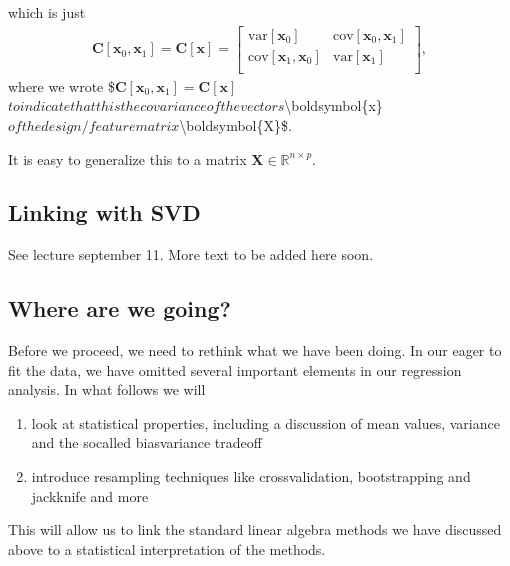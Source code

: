\documentclass[letterpaper,10pt,english]{sphinxmanual}
\begin{document}
which is just
\begin{equation*}
\begin{split}
\boldsymbol{C}[\boldsymbol{x}_0,\boldsymbol{x}_1] = \boldsymbol{C}[\boldsymbol{x}]=\begin{bmatrix} \mathrm{var}[\boldsymbol{x}_0] & \mathrm{cov}[\boldsymbol{x}_0,\boldsymbol{x}_1] \\
                              \mathrm{cov}[\boldsymbol{x}_1,\boldsymbol{x}_0] & \mathrm{var}[\boldsymbol{x}_1] \\
             \end{bmatrix},
\end{split}
\end{equation*}
where we wrote \$\(\boldsymbol{C}[\boldsymbol{x}_0,\boldsymbol{x}_1] = \boldsymbol{C}[\boldsymbol{x}]\)\( to indicate that this the covariance of the vectors \)\textbackslash{}boldsymbol\{x\}\( of the design/feature matrix \)\textbackslash{}boldsymbol\{X\}\$.

It is easy to generalize this to a matrix \(\boldsymbol{X}\in {\mathbb{R}}^{n\times p}\).


\subsection{Linking with SVD}
\label{\detokenize{chapter4:linking-with-svd}}
See lecture september 11. More text to be added here soon.


\subsection{Where are we going?}
\label{\detokenize{chapter4:where-are-we-going}}
Before we proceed, we need to rethink what we have been doing. In our
eager to fit the data, we have omitted several important elements in
our regression analysis. In what follows we will
\begin{enumerate}
%
\item {} 
look at statistical properties, including a discussion of mean values, variance and the so\sphinxhyphen{}called bias\sphinxhyphen{}variance tradeoff

\item {} 
introduce resampling techniques like cross\sphinxhyphen{}validation, bootstrapping and jackknife and more

\end{enumerate}

This will allow us to link the standard linear algebra methods we have discussed above to a statistical interpretation of the methods.
\end{document}
